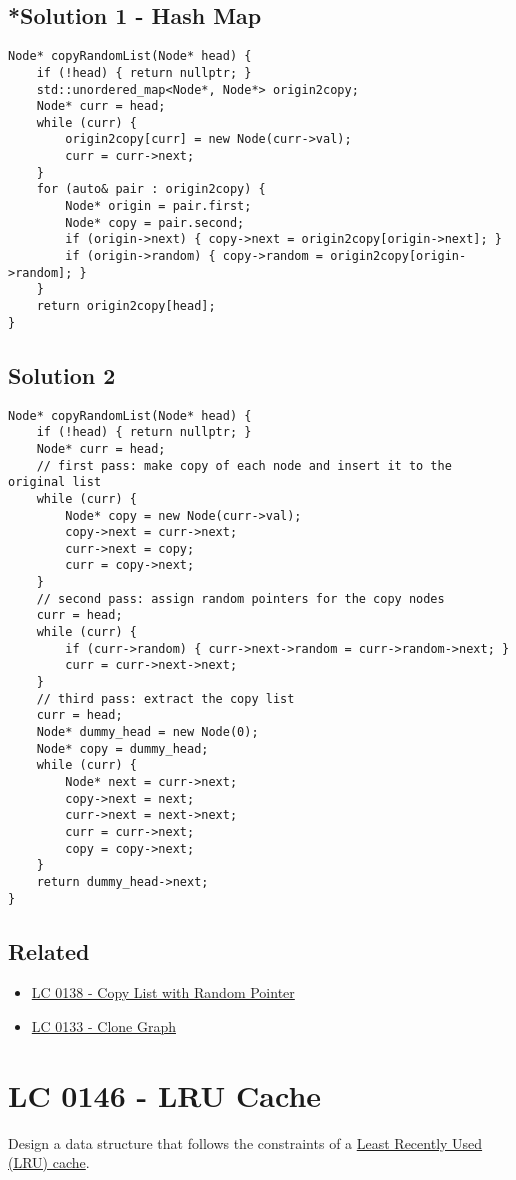 \subsection*{*Solution 1 - Hash Map}
\begin{lstlisting}
Node* copyRandomList(Node* head) {
	if (!head) { return nullptr; }
	std::unordered_map<Node*, Node*> origin2copy;
	Node* curr = head;
	while (curr) {
		origin2copy[curr] = new Node(curr->val);
		curr = curr->next;
	}
	for (auto& pair : origin2copy) {
		Node* origin = pair.first;
		Node* copy = pair.second;
		if (origin->next) { copy->next = origin2copy[origin->next]; }
		if (origin->random) { copy->random = origin2copy[origin->random]; }
	}
	return origin2copy[head];
}
\end{lstlisting}

\subsection*{Solution 2}
\begin{lstlisting}
Node* copyRandomList(Node* head) {
	if (!head) { return nullptr; }
	Node* curr = head;
	// first pass: make copy of each node and insert it to the original list
	while (curr) {
		Node* copy = new Node(curr->val);
		copy->next = curr->next;
		curr->next = copy;
		curr = copy->next;
	}
	// second pass: assign random pointers for the copy nodes
	curr = head;
	while (curr) {
		if (curr->random) { curr->next->random = curr->random->next; }
		curr = curr->next->next;
	}
	// third pass: extract the copy list
	curr = head;
	Node* dummy_head = new Node(0);
	Node* copy = dummy_head;
	while (curr) {
		Node* next = curr->next;
		copy->next = next;
		curr->next = next->next;
		curr = curr->next;
		copy = copy->next;
	}
	return dummy_head->next;
}
\end{lstlisting}

\subsection*{Related}
\begin{itemize}
	\item \hyperref[lc0138]{LC 0138 - Copy List with Random Pointer}
	\item \hyperref[lc0133]{LC 0133 - Clone Graph}
\end{itemize}

\section{LC 0146 - LRU Cache}
Design a data structure that follows the constraints of a \ul{Least Recently Used (LRU) cache}.\\

